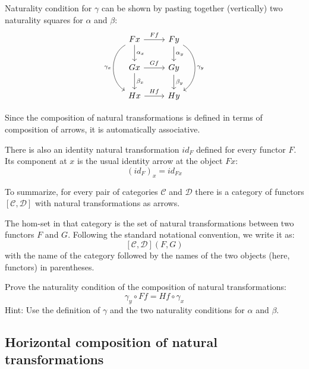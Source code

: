 \documentclass[DaoFP]{subfiles}
\begin{document}
Naturality condition for $\gamma$ can be shown by pasting together (vertically) two naturality squares for $\alpha$ and $\beta$:
\[
 \begin{tikzcd}
 F x
 \arrow[d, "\alpha_x"]
 \arrow[r, "F f"]
 \arrow[dd, bend right = 60, "\gamma_x"']
 &
F y
  \arrow[d, "\alpha_y"]
 \arrow[dd, bend left = 60, "\gamma_y"]
 \\
G x
 \arrow[r, "G f"]
 \arrow[d, "\beta_x"]
& G y
\arrow[d, "\beta_y"]
\\
H x
\arrow[r, "H f"]
& H y
 \end{tikzcd}
\]

Since the composition of natural transformations is defined in terms of composition of arrows, it is automatically associative. 

There is also an identity natural transformation $id_F$ defined for every functor $F$. Its component at $x$ is the usual identity arrow at the object $F x$:
\[ (id_F)_x = id_{F x} \]

To summarize, for every pair of categories $\mathcal{C}$ and $\mathcal{D}$ there is a category of functors $[\mathcal{C}, \mathcal{D}]$ with natural transformations as arrows. 

The hom-set in that category is the set of natural transformations between two functors $F$ and $G$. Following the standard notational convention, we write it as:
\[ [\mathcal{C}, \mathcal{D}](F, G) \]
with the name of the category followed by the names of the two objects (here, functors) in parentheses.


\begin{exercise}
Prove the naturality condition of the composition of natural transformations:
\[ \gamma_y \circ F f = H f \circ \gamma_x \]
Hint: Use the definition of $\gamma$ and the two naturality conditions for $\alpha$ and $\beta$.
\end{exercise}

\subsection{Horizontal composition of natural transformations}
\end{document}
